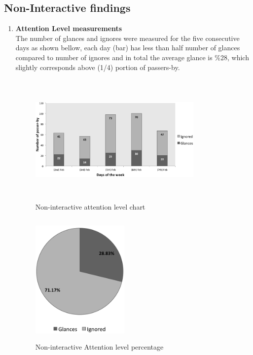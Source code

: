 \subsection{Non-Interactive findings}

\begin{enumerate}

\item \textbf{Attention Level measurements} \\
The number of glances and ignores were measured for the five consecutive days as shown bellow, each day (bar) has less than half number of glances compared to number of ignores and in total the average glance is \%28, which slightly corresponds above (1/4) portion of passers-by.


\begin{figure}[H]
    \centering
    \includegraphics[width=0.8\textwidth,height=6.5cm]{Figures/8/non_inter_findings/Non_Inter_chart}%
    \caption{Non-interactive attention level chart}%
    \label{fig:Nonattentionlevelchart}%
\end{figure}


\begin{figure}[H]
    \centering
    \includegraphics[width=0.45\textwidth,height=6.5cm]{Figures/8/non_inter_findings/non_inter_percentage}
    \caption{Non-interactive Attention level percentage}%
    \label{fig:Nonattentionlevelpercentage}%
\end{figure}




\end{enumerate}
